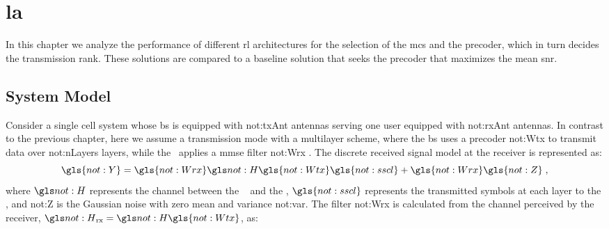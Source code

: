 %

\glsresetall[\acronymtype]
\chapter{\Acl{la}} \label{chp:la}

In this chapter we analyze the performance of different \gls{rl} architectures for the selection of the \gls{mcs} and the precoder, which in turn decides the transmission rank.
%
These solutions are compared to a baseline solution that seeks the precoder that maximizes the mean \gls{snr}.


\section{System Model}
\label{sec:la-system-model}

Consider a single cell system whose \gls{bs} is equipped with \gls{not:txAnt} antennas serving one user equipped with \gls{not:rxAnt} antennas.
%
In contrast to the previous chapter, here we assume a transmission mode with a multilayer scheme, where the \gls{bs} uses a precoder \gls{not:Wtx}  to transmit data over  \gls{not:nLayers} layers, while the \ue~applies a \gls{mmse} filter \gls{not:Wrx} .
%
The discrete received signal model at the receiver is represented as:
\begin{equation}
\label{eq.:rx_signal}
\gls{not:Y} =
\gls{not:Wrx}
\channel
\gls{not:Wtx}
\gls{not:sscl}
+
\gls{not:Wrx}
\gls{not:Z} \;,
\end{equation}
\noindent where $\channel $  represents the channel between the \base~ and the \ue, $\gls{not:sscl}$ represents the transmitted symbols at each layer to the \ue, and \gls{not:Z} is the Gaussian noise with zero mean and variance \gls{not:var}.
%
The filter \gls{not:Wrx} is calculated from the channel perceived by the receiver, $\channel_{\textrm{rx}} = \channel \gls{not:Wtx}$, as:

